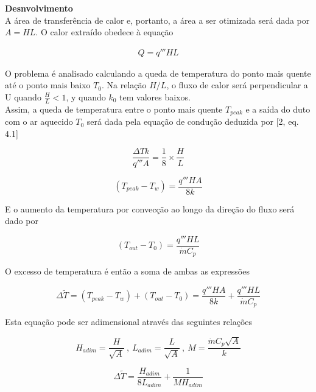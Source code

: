 \documentclass[12pt]{article}
\begin{document}
\textbf{Desnvolvimento}\\

A área de transferência de calor e, portanto, a área a ser otimizada será dada por $A = HL$. O calor extraído obedece à equação

\begin{equation}
	\begin{aligned}
		Q = q''' HL
	\end{aligned}
\end{equation}

O problema é analisado calculando a queda de temperatura do ponto mais quente até o ponto mais baixo $T_{0}$. Na relação $H/L$, o fluxo de calor será perpendicular a U quando $\frac{H}{L} < 1$, y quando $k_{0}$ tem valores baixos.
\\
Assim, a queda de temperatura entre o ponto mais quente $T_{peak}$ e a saída do duto com o ar aquecido $T_{0}$ será dada pela equação de condução deduzida por [2, eq. 4.1]

\begin{equation}
	\frac{\Delta Tk}{q''' A} = \frac{1}{8} \times \frac{H}{L}
\end{equation}

\begin{equation}
	(T_{peak} - T_{w}) = \frac{q'''HA}{8k}
\end{equation}

E o aumento da temperatura por convecção ao longo da direção do fluxo será dado por

\begin{equation}
	(T_{out} - T_{0}) = \frac{q'''HL}{\dot{m} C_{p}}
\end{equation}

O excesso de temperatura é então a soma de ambas as expressões

\begin{equation}
		\Delta \widetilde{T} = (T_{peak} - T_{w}) + (T_{out} - T_{0}) = \frac{q'''HA}{8k} + \frac{q'''HL}{\dot{m} C_{p}}
\end{equation}

Esta equação pode ser adimensional através das seguintes relações

\begin{equation}
	H_{adim} = \frac{H}{\sqrt{A}} \ ,  \ L_{adim} = \frac{L}{\sqrt{A}} \ , \ M = \frac{\dot{m} C_{p} \sqrt{A}}{k}
\end{equation}

\begin{equation}
	\Delta \widetilde{T} = \frac{H_{adim}}{8L_{adim}} + \frac{1}{MH_{adim}}
\end{equation}
\end{document}
